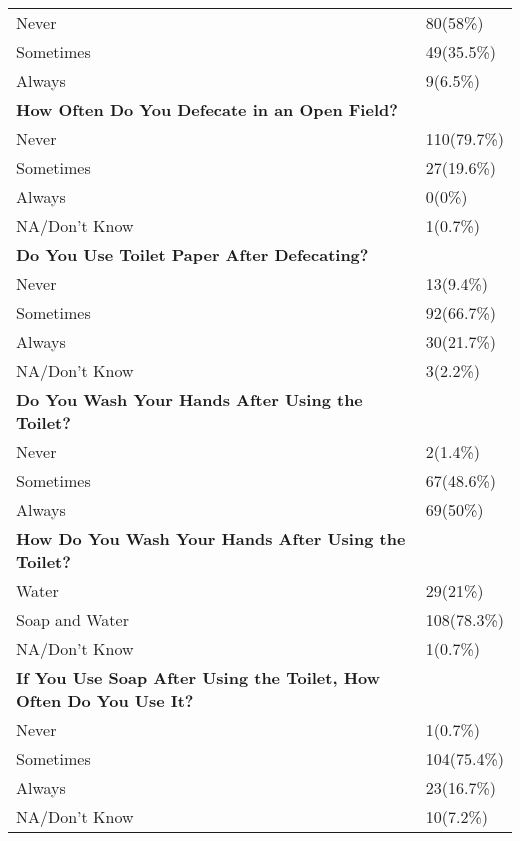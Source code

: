 \documentclass[6pt,letterpaper]{article}
\begin{document}
\begin{tabular}{|l  l|}
\hline
Never & 80(58\%) \\
Sometimes & 49(35.5\%) \\
Always & 9(6.5\%) \\
\hline
\textbf{How Often Do You Defecate in an Open Field?} \\
\hline
Never & 110(79.7\%) \\
Sometimes & 27(19.6\%) \\
Always & 0(0\%) \\
NA/Don't Know & 1(0.7\%) \\
\hline
\textbf{Do You Use Toilet Paper After Defecating?} \\
\hline
Never & 13(9.4\%) \\
Sometimes & 92(66.7\%) \\
Always & 30(21.7\%) \\
NA/Don't Know & 3(2.2\%) \\
\hline
\textbf{Do You Wash Your Hands After Using the Toilet?} \\
\hline
Never & 2(1.4\%) \\
Sometimes & 67(48.6\%) \\
Always & 69(50\%) \\
\hline
\textbf{How Do You Wash Your Hands After Using the Toilet?} \\
\hline
Water & 29(21\%) \\
Soap and Water & 108(78.3\%) \\
NA/Don't Know & 1(0.7\%) \\
\hline
\textbf{If You Use Soap After Using the Toilet, How Often Do You Use It?} \\
\hline
Never & 1(0.7\%) \\
Sometimes & 104(75.4\%) \\
Always & 23(16.7\%) \\
NA/Don't Know & 10(7.2\%) \\
\hline
\end{tabular}
\end{document}
